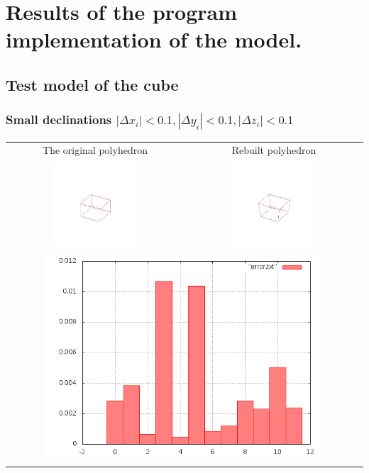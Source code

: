 \documentclass[11pt,fleqn,a4paper]{scrartcl}
\begin{document}
\section{Results of the program implementation of the model.}
\subsection{Test model of the cube}
\subsubsection{Small declinations $|\Delta x_{i}|<0.1,|\Delta y_{i}|<0.1,|\Delta z_{i}|<0.1$}
\begin{center}

\begin{tabular}{|c|c|}
\hline
The original polyhedron& Rebuilt polyhedron \\
\includegraphics[width=0.5\textwidth]{variant2/images/1/input.png} &
\includegraphics[width=0.5\textwidth]{variant2/images/1/out.png} \\
\midrule
\multicolumn{2}{|c|}{ \includegraphics[width=0.8\textwidth]{variant2/images/1/error.png}} \\

\end{tabular}
\end{center}
\end{document}
